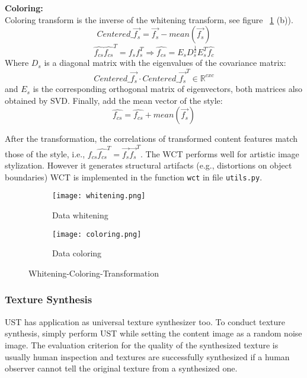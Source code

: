 \textbf{Coloring:}\\
Coloring transform is the inverse of the whitening transform, see figure ~\ref{fig:WCT-vis} (b)).
\begin{equation}
Centered\_\vec{f_s} = \vec{f_s} - mean(\vec{f_s})
\end{equation}
\begin{equation}
\hat{f_{cs}}\hat{f_{cs}}^T=f_sf_s^T \Rightarrow  \hat{f_{cs}} = E_sD_s^{\frac{1}{2}}E_s^T\hat{f_c} 
\end{equation}
Where $D_s$ is a diagonal matrix with the eigenvalues of the covariance matrix:  \begin{equation*}
Centered\_\vec{f_s}\cdot Centered\_\vec{f_s}^T \in\mathbb{R}^{cxc}
\end{equation*}
and $E_s$ is the corresponding orthogonal matrix of eigenvectors, both matrices also obtained by SVD. Finally, add the mean vector of the style:
\begin{equation}
\hat{f_{cs}} = \hat{f_{cs}}+mean(\vec{f_s})
\end{equation}

After the transformation, the correlations of transformed content features match those of the style, i.e., $\hat{f_{cs}} \hat{f_{cs}}^T = \vec{f_s} \vec{f_s}^T$.
The WCT performs well for artistic image stylization. However it generates
structural artifacts (e.g., distortions on object boundaries)
WCT is implemented in the function \texttt{wct} in file \texttt{utils.py}.

\begin{figure}[h!]
	\centering
	\begin{subfigure}[b]{0.4\linewidth}
		\texttt{[image: whitening.png]}
		\caption{Data whitening}
	\end{subfigure}
	\begin{subfigure}[b]{0.4\linewidth}
		\texttt{[image: coloring.png]}
		\caption{Data coloring}
	\end{subfigure}
	\caption{Whitening-Coloring-Transformation}
	\label{fig:WCT-vis}
\end{figure}

\subsubsection{Texture Synthesis}\label{subsec:texture}
UST has application as universal texture synthesizer too. To conduct texture synthesis, simply perform UST while setting the content image as a random noise image. The evaluation criterion for the quality of the synthesized texture is usually human inspection and textures are successfully synthesized if a human observer cannot tell the original texture from a synthesized one.


